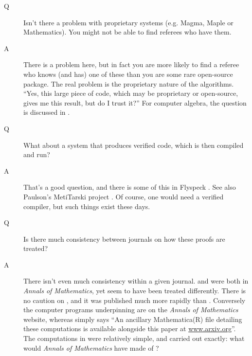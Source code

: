 \begin{description}
\item[Q]Isn't there a problem with proprietary systems (e.g. Magma, Maple or Mathematics). You might not be able to find referees who have them.
\item[A]There is a problem here, but in fact you are more likely to find a referee who knows (and has) one of these than you are some rare open-source package. The real problem is the proprietary nature of the algorithms. ``Yes, this large piece of code, which may be proprietary or open-source, gives me this result, but do I trust it?''  For computer algebra, the question is discussed in \cite{Davenport2017z}.
\item[Q]What about a system that produces verified code, which is then compiled and run?
\item[A]That's a good question, and there is some of this in Flyspeck \cite{Halesetal2017a}.  See also Paulson's MetiTarski project \cite{AkbarpourPaulson2010}.
Of course, one would need a verified compiler, but such things exist these days.
\item[Q]Is there much consistency between journals on how these proofs are treated?
\item[A]There isn't even much consistency within a given journal. \cite{Hales2005} and \cite{Maynard2015a} were both in \emph{Annals of Mathematics}, yet seem to have been treated differently. There is no caution on \cite{Maynard2015a}, and it was published much more rapidly than  \cite{Hales2005}. Conversely the computer programs underpinning \cite{Hales2005} are on the \emph{Annals of Mathematics} website, whereas \cite{Maynard2015a} simply says ``An ancillary Mathematica(R) file detailing these computations is available alongside this
paper at \url{ www.arxiv.org}''. The computations in \cite{Maynard2015a} were relatively simple, and carried out exactly: what would \emph{Annals of Mathematics} have made of \cite{Maynard2013a}?
\end{description}
